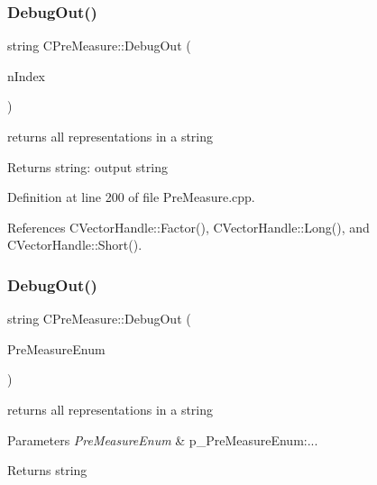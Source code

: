 \subsubsection{\texorpdfstring{Debug\+Out()}{DebugOut()}\hspace{0.1cm}{\footnotesize\ttfamily [1/2]}}
{\footnotesize\ttfamily string C\+Pre\+Measure\+::\+Debug\+Out (\begin{DoxyParamCaption}\item[{const int}]{n\+Index }\end{DoxyParamCaption})}



returns all representations in a string 

\begin{DoxyReturn}{Returns}
string\+: output string 
\end{DoxyReturn}


Definition at line 200 of file Pre\+Measure.\+cpp.



References C\+Vector\+Handle\+::\+Factor(), C\+Vector\+Handle\+::\+Long(), and C\+Vector\+Handle\+::\+Short().

\mbox{\label{classCPreMeasure_a15f09957565ea1a5b4ca5975c1bbd76a}} 
\subsubsection{\texorpdfstring{Debug\+Out()}{DebugOut()}\hspace{0.1cm}{\footnotesize\ttfamily [2/2]}}
{\footnotesize\ttfamily string C\+Pre\+Measure\+::\+Debug\+Out (\begin{DoxyParamCaption}\item[{const \hyperlink{PreMeasure_8h_a6c81167b8d4c2badde42f81cb7214620}{e\+Pre\+Measure}}]{Pre\+Measure\+Enum }\end{DoxyParamCaption})}



returns all representations in a string 


\begin{DoxyParams}{Parameters}
{\em Pre\+Measure\+Enum} & p\+\_\+\+Pre\+Measure\+Enum\+:... \\
\hline
\end{DoxyParams}
\begin{DoxyReturn}{Returns}
string 
\end{DoxyReturn}


